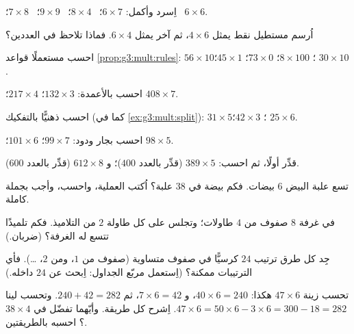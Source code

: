 \begin{exercise}[$\star$]\label{exo:g3:mult:2}
اِسرد وأكمل: $6 \times 7$؛ \ $8 \times 4$؛ \ $9 \times 9$؛
\ $7 \times 8$؛ \ $6 \times 6$.
\end{exercise}

\begin{exercise}[$\star$]\label{exo:g3:mult:3}
اُرسم مستطيل نقط يمثل $4 \times 6$، ثم آخر يمثل $6 \times 4$.
فماذا تلاحظ في العددين؟
\end{exercise}

\begin{exercise}[$\star$]\label{exo:g3:mult:4}
احسب مستعملًا قواعد \cref{prop:g3:mult:rules}:
$56 \times 10$؛ \quad $8 \times 100$؛ \quad $73 \times 0$؛ \quad
$45 \times 1$؛ \quad $30 \times 10$.
\end{exercise}

\begin{exercise}[$\star$]\label{exo:g3:mult:5}
احسب بالأعمدة: $132 \times 3$؛ \quad $217 \times 4$؛ \quad
$408 \times 7$.
\end{exercise}

\begin{exercise}[$\star$]\label{exo:g3:mult:6}
احسب ذهنيًّا بالتفكيك (كما في \cref{ex:g3:mult:split}):
$31 \times 5$؛ \quad $42 \times 3$؛ \quad $25 \times 6$.
\end{exercise}

\begin{exercise}[$\star$]\label{exo:g3:mult:7}
احسب بجار ودود: $99 \times 7$؛ \quad
$101 \times 6$؛ \quad $98 \times 5$.
\end{exercise}

\begin{exercise}[$\star$]\label{exo:g3:mult:8}
قدِّر أولًا، ثم احسب: $389 \times 5$ (قدِّر بالعدد $400$)؛
و $612 \times 8$ (قدِّر بالعدد $600$).
\end{exercise}

\begin{exercise}[$\star$]\label{exo:g3:mult:9}
تسع علبة البيض $6$ بيضات. فكم بيضة في $38$ علبة؟ اُكتب
العملية، واحسب، وأجب بجملة كاملة.
\end{exercise}

\begin{exercise}[$\star\star$]\label{exo:g3:mult:10}
في غرفة $8$ صفوف من $4$ طاولات؛ وتجلس على كل طاولة $2$ من
التلاميذ. فكم تلميذًا تتسع له الغرفة؟ (ضربان.)
\end{exercise}

\begin{exercise}[$\star\star$]\label{exo:g3:mult:11}
جِد كل طرق ترتيب $24$ كرسيًّا في صفوف متساوية (صفوف من
$1$، ومن $2$، \dots). فأي الترتيبات ممكنة؟ (اِستعمل مربّع
الجداول: اِبحث عن $24$ داخله.)
\end{exercise}

\begin{exercise}[$\star\star$]\label{exo:g3:mult:12}
تحسب زينة $47 \times 6$ هكذا: $40 \times 6 = 240$،
و $7 \times 6 = 42$، ثم $240 + 42 = 282$. وتحسب لينا
$47 \times 6 = 50 \times 6 - 3 \times 6 = 300 - 18 = 282$. اِشرح
كل طريقة. وأيّهما تفضّل في $38 \times 4$؟ احسبه
بالطريقتين.
\end{exercise}
